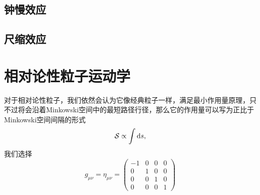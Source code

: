 \documentclass[a4paper]{report}
\begin{document}
\subsection*{钟慢效应}
\subsection*{尺缩效应}

\section{相对论性粒子运动学}
对于相对论性粒子，我们依然会认为它像经典粒子一样，满足最小作用量原理，只不过将会沿着Minkowski空间中的最短路径行径，那么它的作用量可以写为正比于Minkowski空间间隔的形式
\begin{equation}
    \mathcal{S} \propto \int \mathrm{d} s ,
\end{equation}
我们选择
    \begin{equation}
    g_{\mu\nu} = \eta_{\mu\nu} = \begin{pmatrix}
        -1& 0& 0& 0\\
        0& 1& 0& 0\\
        0& 0& 1& 0\\
        0& 0& 0& 1
    \end{pmatrix}
\end{equation}
\end{document}
